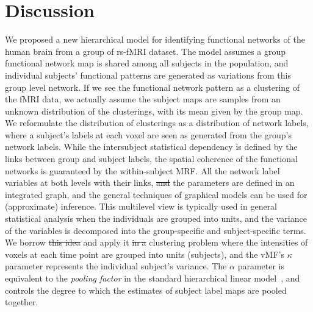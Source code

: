 \documentclass[review,authoryear]{elsarticle}
\providecommand{\DIFadd}[1]{{\protect\color{blue}\uwave{#1}}} %
\providecommand{\DIFdel}[1]{{\protect\color{red}\sout{#1}}}                      %
\providecommand{\DIFaddbegin}{} %
\providecommand{\DIFaddend}{} %
\providecommand{\DIFdelbegin}{} %
\providecommand{\DIFdelend}{} %
\begin{document}
\section{Discussion}
\label{sec:discussion}
We proposed a new hierarchical model for identifying functional networks of the
human brain from a group of rs-fMRI dataset. The model assumes a group
functional network map is shared among all subjects in the population, and
individual subjects' functional patterns are generated as variations from this
group level network. If we see the functional network pattern as a clustering of
the fMRI data, we actually assume the subject maps are samples from an unknown
distribution of the clusterings, with its mean given by the group map. We
reformulate the distribution of clusterings as a distribution of network labels,
where a subject's labels at each voxel are seen as generated from the group's
network labels. While the intersubject statistical dependency is defined by the
links between group and subject labels, the spatial coherence of the functional
networks is guaranteed by the within-subject MRF. All the network label
variables at both levels with their links, \DIFdelbegin \DIFdel{and }\DIFdelend \DIFaddbegin \DIFadd{along with }\DIFaddend the parameters are defined
in an integrated graph, and the general techniques of graphical models can be
used for (approximate) inference. This multilevel view is typically used in
general statistical analysis when the individuals are grouped into units, and
the variance of the variables is decomposed into the group-specific and
subject-specific terms. We borrow \DIFdelbegin \DIFdel{this idea }\DIFdelend \DIFaddbegin \DIFadd{the multilevel view }\DIFaddend and apply it \DIFdelbegin \DIFdel{in a }\DIFdelend \DIFaddbegin \DIFadd{to the
}\DIFaddend clustering problem where the intensities of voxels at each time point are
grouped into units (subjects), and the vMF's $\kappa$ parameter represents the
individual subject's variance. The $\alpha$ parameter is equivalent to the
\emph{pooling factor} in the standard hierarchical linear
model~\citep{gelman2006bayesian}, and controls the degree to which the estimates
of subject label maps are pooled together.
\end{document}
